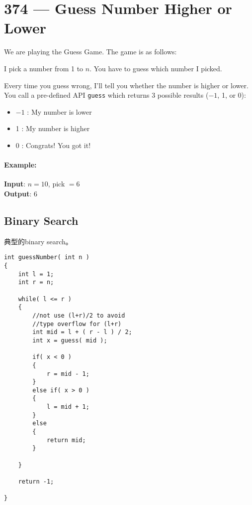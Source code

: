 \section{374 --- Guess Number Higher or Lower}
We are playing the Guess Game. The game is as follows:
\par
I pick a number from 1 to $ n $. You have to guess which number I picked.
\par
Every time you guess wrong, I'll tell you whether the number is higher or lower.
You call a pre-defined API \texttt{guess} which returns 3 possible results ($ -1 $, 1, or 0):
\begin{itemize}
\item $ -1 $ : My number is lower
\item  1 : My number is higher
\item  0 : Congrats! You got it!
\end{itemize}

\paragraph{Example:}

\begin{flushleft}
\textbf{Input}: $  n = 10 $, pick $ = 6 $
\\
\textbf{Output}: 6
\end{flushleft}

\subsection{Binary Search}
典型的binary search。

\setcounter{lstlisting}{0}
\begin{lstlisting}[style=customc, caption={Binary Search}]
int guessNumber( int n )
{
    int l = 1;
    int r = n;

    while( l <= r )
    {
        //not use (l+r)/2 to avoid
        //type overflow for (l+r)
        int mid = l + ( r - l ) / 2;
        int x = guess( mid );

        if( x < 0 )
        {
            r = mid - 1;
        }
        else if( x > 0 )
        {
            l = mid + 1;
        }
        else
        {
            return mid;
        }

    }

    return -1;

}
\end{lstlisting}